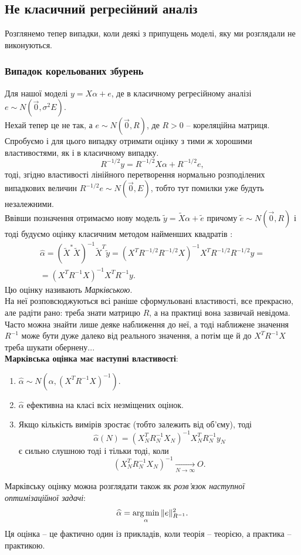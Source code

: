 \subsection{Не класичний регресійний аналіз}
Розглянемо тепер випадки, коли деякі з припущень моделі, яку ми розглядали не виконуються.
\subsubsection{Випадок корельованих збурень}
Для нашої моделі $ y = X \alpha + e$, де в класичному регресійному аналізі $e \sim N(\vec0, \sigma^2E)$. \\

Нехай тепер це не так, а $e \sim N(\vec0, R)$, де $R > 0$ -- кореляційна матриця. Спробуємо і для цього випадку отримати оцінку з тими ж хорошими властивостями, як і в класичному випадку. \\

\[ R^{-1/2}y = R^{-1/2}X\alpha + R^{-1/2}e, \] тоді, згідно властивості лінійного перетворення нормально розподілених випадкових величин $R^{-1/2}e \sim N(\vec0, E)$, тобто тут помилки уже будуть незалежними. \\

Ввівши позначення отримаємо нову модель $\widetilde{y} = \widetilde{X}\alpha + \widetilde{e}$ причому $\widetilde{e}\sim N(\vec0,R)$ і тоді будуємо оцінку класичним методом найменших квадратів : \begin{multline*} \widehat{\alpha} = (\widetilde{X}^*\widetilde{X})^{-1}\widetilde{X}^T\widetilde{y}=(X^TR^{-1/2}R^{-1/2}X)^{-1}X^TR^{-1/2}R^{-1/2}y=\\
=(X^TR^{-1}X)^{-1}X^TR^{-1}y. \end{multline*}
Цю оцінку називають \textit{Марківською}. \\

На неї розповсюджуються всі раніше сформульовані властивості, все прекрасно, але радіти рано: треба знати матрицю $R$, а на практиці вона зазвичай невідома. Часто можна знайти лише деяке наближення до неї, а тоді наближене значення $R^{-1}$ може бути дуже далеко від реального значення, а потім ще й до $X^TR^{-1}X$ треба шукати обернену... \\

\textbf{Марківська оцінка має наступні властивості}:
\begin{enumerate}
	\item $\widehat{\alpha}\sim N(\alpha, (X^TR^{-1}X)^{-1})$. 
	\item $\widehat{\alpha}$ ефективна на класі всіх незміщених оцінок.
	\item Якщо кількість вимірів зростає (тобто залежить від об’єму), тоді \[ \widehat{\alpha}(N) = (X_N^TR_N^{-1}X_N)^{-1}X_N^TR_N^{-1}y_N \] є сильно слушною тоді і тільки тоді, коли \[ (X_N^TR_N^{-1}X_N)^{-1} \xrightarrow[N\to\infty]{} O. \]
\end{enumerate}
Марківську оцінку можна розглядати також як \textit{розв’язок наступної оптимізаційної задачі}: \[ \widehat{\alpha} = \operatorname*{arg\,min}_\alpha \|e\|_{R^{-1}}^2. \]
Ця оцінка -- це фактично один із прикладів, коли теорія -- теорією, а практика -- практикою.
